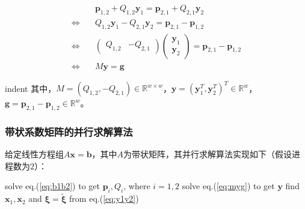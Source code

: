 \documentclass[UTF8,nofonts]{ctexart}
\begin{document}
\begin{align}
\label{eq:myg}
&\quad\boldsymbol{p}_{1,2}+Q_{1,2}\boldsymbol{y}_1=\boldsymbol{p}_{2,1}+Q_{2,1}\boldsymbol{y}_2 \nonumber\\
\Longleftrightarrow &\quad Q_{1,2}\boldsymbol{y}_1-Q_{2,1}\boldsymbol{y}_2=\boldsymbol{p}_{2,1}-\boldsymbol{p}_{1,2} \nonumber\\
\Longleftrightarrow &\quad
\begin{pmatrix}Q_{1,2}&-Q_{2,1}\end{pmatrix}\begin{pmatrix}\boldsymbol{y}_1\nonumber\\\boldsymbol{y}_2\end{pmatrix}=\boldsymbol{p}_{2,1}-\boldsymbol{p}_{1,2} \nonumber\\
\Longleftrightarrow &\quad M\boldsymbol{y}=\boldsymbol{g}
\end{align}

indent 其中，$M=(Q_{1,2},-Q_{2,1})\in\mathbb{R}^{w \times w}$，$\boldsymbol{y}=(\boldsymbol{y}_1^T,\boldsymbol{y}_2^T)^T\in\mathbb{R}^{w}$，$\boldsymbol{g}=\boldsymbol{p}_{2,1}-\boldsymbol{p}_{1,2}\in\mathbb{R}^{w}$。

\subsubsection*{带状系数矩阵的并行求解算法}

给定线性方程组$A\boldsymbol{x}=\boldsymbol{b}$，其中$A$为带状矩阵，其并行求解算法实现如下（假设进程数为$2$）：

\begin{algorithm}[H]
solve eq.(\ref{eq:b1b2}) to get $\boldsymbol{p}_i,Q_i$, where $i=1,2$\;
solve eq.(\ref{eq:myg}) to get $\boldsymbol{y}$\;
find $\boldsymbol{x}_1,\boldsymbol{x}_2$ and $\boldsymbol{\xi}=\boldsymbol{\tilde{\xi}}$ from eq.(\ref{eq:y1y2})\;
\end{algorithm}
\end{document}

